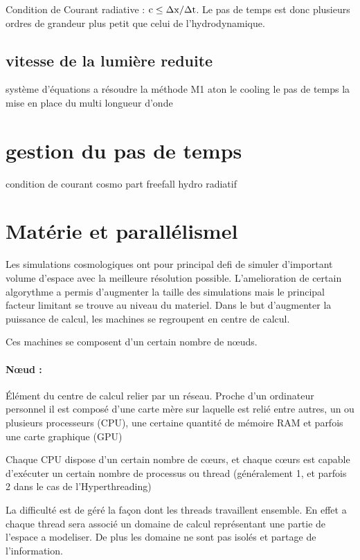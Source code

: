 Condition de Courant radiative : $\rm{ c \leq \Delta x / \Delta t }$.
Le pas de temps est donc plusieurs ordres de grandeur plus petit que celui de l'hydrodynamique.

\subsection{vitesse de la lumière reduite}


système d'équations a résoudre
la méthode M1
aton
le cooling
le pas de temps
la mise en place du multi longueur d'onde

\section{gestion du pas de temps}

condition de courant
cosmo
part
freefall
hydro
radiatif

\section{Matérie et parallélismel}

Les simulations cosmologiques ont pour principal defi de simuler d'important volume d'espace avec la meilleure résolution possible.
L'amelioration de certain algorythme a permis d'augmenter la taille des simulations mais le principal facteur limitant se trouve au niveau du materiel.
Dans le but d'augmenter la puissance de calcul, les machines se regroupent en centre de calcul.

Ces machines se composent d'un certain nombre de nœuds.

\paragraph{Nœud :} Élément du centre de calcul relier par un réseau.
Proche d'un ordinateur personnel il est composé d'une carte mère sur laquelle est relié entre autres, un ou plusieurs processeurs (CPU), une certaine quantité de mémoire RAM et parfois une carte graphique (GPU)

Chaque CPU dispose d'un certain nombre de cœurs, et chaque cœurs est capable d'exécuter un certain nombre de processus ou thread (généralement 1, et parfois 2 dans le cas de l'Hyperthreading)

La difficulté est de géré la façon dont les threads travaillent ensemble.
En effet a chaque thread sera associé un domaine de calcul représentant une partie de l'espace a modeliser.
De plus les domaine ne sont pas isolés et partage de l'information. 

